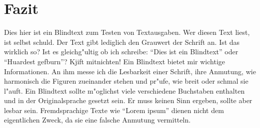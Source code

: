 
\section{Fazit}%
\label{sec:fazit} 

Dies hier ist ein Blindtext zum Testen von Textausgaben. Wer diesen Text liest, ist selbst
schuld. Der Text gibt lediglich den Grauwert der Schrift an. Ist das wirklich so? Ist es
gleichg"ultig ob ich schreibe: ``Dies ist ein Blindtext'' oder ``Huardest gefburn''? Kjift 
mitnichten! Ein Blindtext bietet mir wichtige Informationen. An ihm messe ich die Lesbarkeit 
einer Schrift, ihre Anmutung, wie harmonisch die Figuren zueinander stehen
und pr"ufe, wie breit oder schmal sie l"auft. Ein Blindtext sollte m"oglichst viele 
verschiedene Buchstaben enthalten und in der Originalsprache gesetzt sein. Er muss keinen
Sinn ergeben, sollte aber lesbar sein. Fremdsprachige Texte wie ``Lorem ipsum'' dienen nicht 
dem eigentlichen Zweck, da sie eine falsche Anmutung vermitteln.
